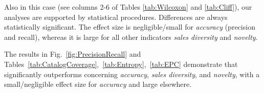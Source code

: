 Also in this case (see columns 2-6 of Tables \ref{tab:Wilcoxon} and \ref{tab:Cliff}), our analyses are supported by statistical procedures. Differences are always statistically significant. The effect size is negligible/small for \emph{accuracy} (precision and recall), whereas it is large for all other indicators \emph{sales diversity} and \emph{novelty}.



\begin{tcolorbox}[boxrule=0.86pt,left=0.3em, right=0.3em,top=0.1em, bottom=0.05em]
	\small{The results in Fig.~\ref{fig:PrecisionRecall} and 
		Tables~\ref{tab:CatalogCoverage},~\ref{tab:Entropy},~\ref{tab:EPC} demonstrate 
		that \CR significantly outperforms \LR concerning 
		\emph{accuracy}, \emph{sales diversity}, and \emph{novelty}, with a 
		small/negligible effect size for \emph{accuracy} and large elsewhere.}
\end{tcolorbox}





%
%

